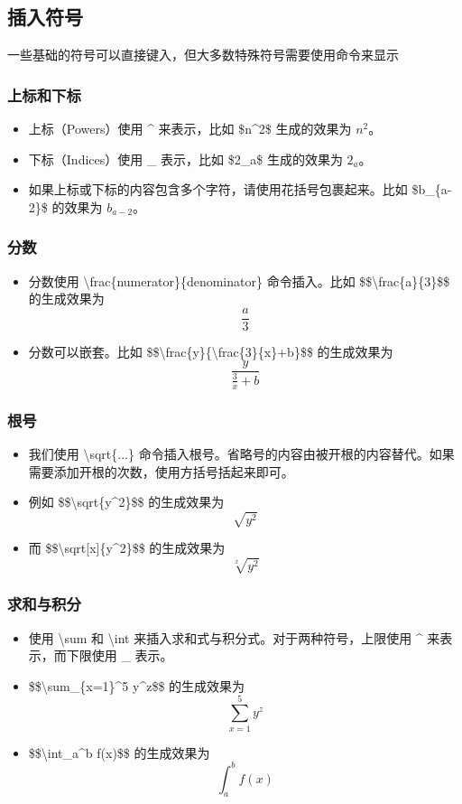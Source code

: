 \documentclass{article}
\begin{document}
\subsection{插入符号}
一些基础的符号可以直接键入，但大多数特殊符号需要使用命令来显示

\subsubsection{上标和下标}
\begin{itemize}
\item 上标（Powers）使用 \^{} 来表示，比如 \$n\^{}2\$ 生成的效果为 $n^2$。

\item 下标（Indices）使用 \_{} 表示，比如 \$2\_{}a\$ 生成的效果为 $2_a$。

\item 如果上标或下标的内容包含多个字符，请使用花括号包裹起来。比如 \$b\_{}\{a-2\}\$ 的效果为 $b_{a-2}$。
\end{itemize}

\subsubsection{分数}
\begin{itemize}
\item 分数使用 \textbackslash frac\{numerator\}\{denominator\} 命令插入。比如 \$\$\textbackslash frac\{a\}\{3\}\$\$ 的生成效果为$$\frac{a}{3}$$
\item 分数可以嵌套。比如 \$\$\textbackslash frac\{y\}\{\textbackslash frac\{3\}\{x\}+b\}\$\$ 的生成效果为$$\frac{y}{\frac{3}{x}+b}$$
\end{itemize}

\subsubsection{根号}
\begin{itemize}
\item 我们使用 \textbackslash sqrt\{...\} 命令插入根号。省略号的内容由被开根的内容替代。如果需要添加开根的次数，使用方括号括起来即可。
\item 例如 \$\$\textbackslash sqrt\{y\^{}2\}\$\$ 的生成效果为 $$\sqrt{y^2}$$
\item 而 \$\$\textbackslash sqrt[x]\{y\^{}2\}\$\$ 的生成效果为 $$\sqrt[x]{y^2}$$ 
\end{itemize}

\subsubsection{求和与积分}
\begin{itemize}
\item 使用 \textbackslash sum 和 \textbackslash int 来插入求和式与积分式。对于两种符号，上限使用 \^{} 来表示，而下限使用 \_{} 表示。
\item \$\$\textbackslash sum\_{}\{x=1\}\^{}5 y\^{}z\$\$ 的生成效果为$$\sum_{x=1}^5 y^z$$
\item \$\$\textbackslash int\_{}a\^{}b f(x)\$\$ 的生成效果为$$\int_a^b f(x)$$
\end{itemize}
\end{document}
